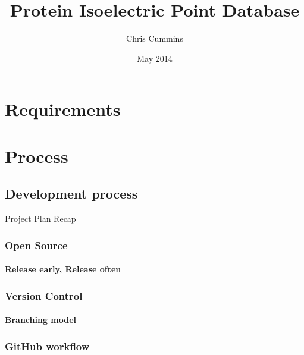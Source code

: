 \title{Protein Isoelectric Point Database}
\author{Chris Cummins}
\newcommand{\subtitle}{EE4FYP Report}
\newcommand{\institution}{Electronic Engineering\\
  School of Engineering and Applied Science\\
  Aston University}
\date{May 2014}









\tableofcontents
\listoffigures
\listoftables

\newpage




\chapter{Requirements}

\lipsum[10-20]

\chapter{Process}

\section{Development process}
Project Plan Recap

\subsection{Open Source}
\subsubsection{Release early, Release often}

\subsection{Version Control}
\subsubsection{Branching model}

\subsection{GitHub workflow}

